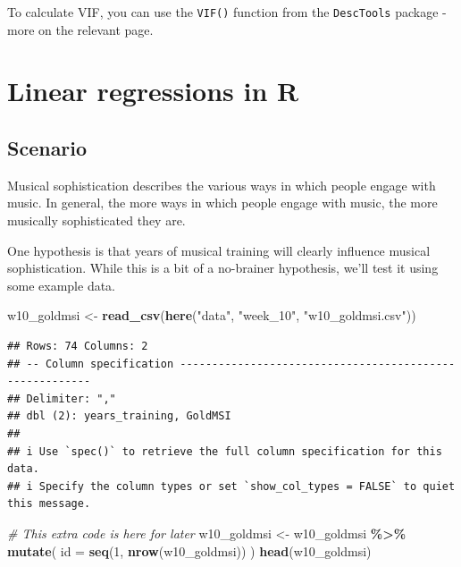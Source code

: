 \documentclass[
]{book}
\newenvironment{Shaded}{\begin{snugshade}}{\end{snugshade}}
\newcommand{\AttributeTok}[1]{\textcolor[rgb]{0.13,0.29,0.53}{#1}}
\newcommand{\CommentTok}[1]{\textcolor[rgb]{0.56,0.35,0.01}{\textit{#1}}}
\newcommand{\DecValTok}[1]{\textcolor[rgb]{0.00,0.00,0.81}{#1}}
\newcommand{\FunctionTok}[1]{\textcolor[rgb]{0.13,0.29,0.53}{\textbf{#1}}}
\newcommand{\NormalTok}[1]{#1}
\newcommand{\OtherTok}[1]{\textcolor[rgb]{0.56,0.35,0.01}{#1}}
\newcommand{\SpecialCharTok}[1]{\textcolor[rgb]{0.81,0.36,0.00}{\textbf{#1}}}
\newcommand{\StringTok}[1]{\textcolor[rgb]{0.31,0.60,0.02}{#1}}
\begin{document}
To calculate VIF, you can use the \texttt{VIF()} function from the \texttt{DescTools} package - more on the relevant page.

\section{Linear regressions in R}\label{linear-regressions-in-r}

\subsection{Scenario}\label{scenario}

Musical sophistication describes the various ways in which people engage with music. In general, the more ways in which people engage with music, the more musically sophisticated they are.

One hypothesis is that years of musical training will clearly influence musical sophistication. While this is a bit of a no-brainer hypothesis, we'll test it using some example data.

\begin{Shaded}
\begin{Highlighting}[]
\NormalTok{w10\_goldmsi }\OtherTok{\textless{}{-}} \FunctionTok{read\_csv}\NormalTok{(}\FunctionTok{here}\NormalTok{(}\StringTok{"data"}\NormalTok{, }\StringTok{"week\_10"}\NormalTok{, }\StringTok{"w10\_goldmsi.csv"}\NormalTok{)) }
\end{Highlighting}
\end{Shaded}

\begin{verbatim}
## Rows: 74 Columns: 2
## -- Column specification --------------------------------------------------------
## Delimiter: ","
## dbl (2): years_training, GoldMSI
## 
## i Use `spec()` to retrieve the full column specification for this data.
## i Specify the column types or set `show_col_types = FALSE` to quiet this message.
\end{verbatim}

\begin{Shaded}
\begin{Highlighting}[]
\CommentTok{\# This extra code is here for later}
\NormalTok{w10\_goldmsi }\OtherTok{\textless{}{-}}\NormalTok{ w10\_goldmsi }\SpecialCharTok{\%\textgreater{}\%}
    \FunctionTok{mutate}\NormalTok{(}
    \AttributeTok{id =} \FunctionTok{seq}\NormalTok{(}\DecValTok{1}\NormalTok{, }\FunctionTok{nrow}\NormalTok{(w10\_goldmsi))}
\NormalTok{  ) }
\FunctionTok{head}\NormalTok{(w10\_goldmsi)}
\end{Highlighting}
\end{Shaded}
\end{document}
